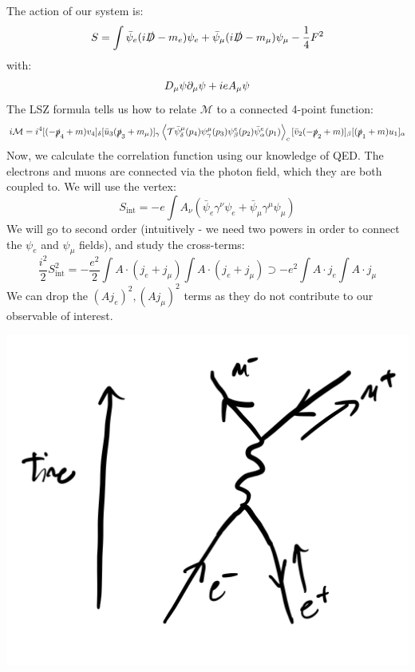 The action of our system is:
\begin{equation}
    S = \int \bar{\psi}_e(i\slashed{D} - m_e)\psi_e + \bar{\psi}_\mu(i\slashed{D} - m_\mu)\psi_\mu - \frac{1}{4}F^2
\end{equation}
with:
\begin{equation}
    D_\mu \psi \partial_\mu \psi + i e A_\mu \psi
\end{equation}
The LSZ formula tells us how to relate $\mathcal{M}$ to a connected 4-point function:
\begin{equation}
    i\mathcal{M} = i^4[(-\slashed{p}_4 + m)v_4]_\delta[\bar{u}_3(\slashed{p}_3 + m_\mu)]_\gamma\left< \mathcal{T}\bar{\psi}^\mu_\delta(p_4)\psi^\mu_\gamma(p_3)\psi^e_\beta(p_2)\bar{\psi}^e_\alpha(p_1) \right>_c[\bar{v}_2(-\slashed{p}_2 + m)]_\beta[(\slashed{p}_1 + m)u_1]_\alpha
\end{equation}
Now, we calculate the correlation function using our knowledge of QED. The electrons and muons are connected via the photon field, which they are both coupled to. We will use the vertex:
\begin{equation}
    S_{\text{int}} = -e\int A_\nu(\bar{\psi}_e\gamma^\nu \psi_e + \bar{\psi}_\mu \gamma^\mu \psi_\mu)
\end{equation}
We will go to second order (intuitively - we need two powers in order to connect the $\psi_e$ and $\psi_\mu$ fields), and study the cross-terms:
\begin{equation}
    \frac{i^2}{2}S_{\text{int}}^2 = -\frac{e^2}{2}\int A \cdot (j_e + j_\mu)\int A\cdot (j_e + j_\mu) \supset -e^2\int A\cdot j_e\int A\cdot j_\mu
\end{equation}
We can drop the $(Aj_e)^2, (Aj_\mu)^2$ terms as they do not contribute to our observable of interest.

\begin{center}
    \includegraphics[scale=0.35]{Lectures/Images/lec13-mumueeschannel.png}
\end{center}

